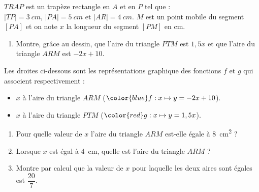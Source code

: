 %
%
    \begin{minipage}{.48\linewidth}
        
    \end{minipage}
    \begin{minipage}{.48\linewidth}
        $TRAP$ est un trapèze rectangle en $A$ et en $P$ tel que :\\
    $|TP| = \SI{3}{cm}$, $|PA| = \SI{5}{cm}$ et $|AR|=\SI{4}{cm}$.\medbreak
    $M$ est un point mobile du segment $[PA]$ et on note $x$ la longueur du segment $[PM]$ en cm.
    \end{minipage}

    \begin{enumerate}[series=mine]
        \item Montre, grâce au dessin, que l'aire du triangle $PTM$ est $1,5x$ et que l'aire du triangle $ARM$ est $-2x+10$.
    \end{enumerate}

    Les droites ci-dessous sont les représentations graphique des fonctions $f$ et $g$ qui associent respectivement :
    \begin{itemize}[label=]
        \item $x$ à l'aire du triangle $ARM$ ($\color{blue}f:x\mapsto y= -2x+10$).
        \item $x$ à l'aire du triangle $PTM$ ($\color{red}g:x\mapsto y=1,5x$).
    \end{itemize}

    

    \begin{enumerate}[resume=mine]
        \item Pour quelle valeur de $x$ l'aire du triangle $ARM$ est-elle égale à \SI{8}{cm^2} ?
        \item Lorsque $x$ est égal à \SI{4}{cm}, quelle est l'aire du triangle $ARM$ ?
        \item Montre par calcul que la valeur de $x$ pour laquelle les deux aires sont égales est $\dfrac{20}{7}$.
    \end{enumerate}
